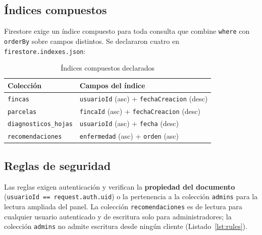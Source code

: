 \documentclass[12pt,a4paper]{article}
\begin{document}
\subsection{Índices compuestos}

Firestore exige un índice compuesto para toda consulta que combine \texttt{where}
con \texttt{orderBy} sobre campos distintos. Se declararon cuatro en
\texttt{firestore.indexes.json}:

\begin{table}[H]
\centering
\caption{Índices compuestos declarados}
\label{tab:indices}
\renewcommand{\arraystretch}{1.25}
\begin{tabular}{p{4.2cm} p{9.0cm}}
\toprule
\bfseries Colección & \bfseries Campos del índice \\
\midrule
\texttt{fincas} & \texttt{usuarioId} (asc) + \texttt{fechaCreacion} (desc) \\
\texttt{parcelas} & \texttt{fincaId} (asc) + \texttt{fechaCreacion} (desc) \\
\texttt{diagnosticos\_hojas} & \texttt{usuarioId} (asc) + \texttt{fecha} (desc) \\
\texttt{recomendaciones} & \texttt{enfermedad} (asc) + \texttt{orden} (asc) \\
\bottomrule
\end{tabular}
\end{table}

\subsection{Reglas de seguridad}

Las reglas exigen autenticación y verifican la \textbf{propiedad del documento}
(\texttt{usuarioId == request.auth.uid}) o la pertenencia a la colección
\texttt{admins} para la lectura ampliada del panel. La colección
\texttt{recomendaciones} es de lectura para cualquier usuario autenticado y de
escritura solo para administradores; la colección \texttt{admins} no admite
escritura desde ningún cliente (Listado~\ref{lst:rules}).
\end{document}
